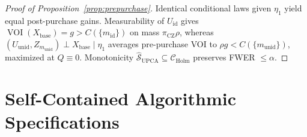 \documentclass[11pt]{article}
\theoremstyle{remark}
\begin{document}
\begin{proof}[Proof of Proposition~\ref{prop:prepurchase}]
Identical conditional laws given $\eta_1$ yield equal post-purchase gains. Measurability of $U_{\text{id}}$ gives $\operatorname{VOI}(X_{\text{base}}) = g > C(\{m_{\text{id}}\})$ on mass $\pi_{\text{CZ}}\rho$, whereas $(U_{\text{unid}}, Z_{m_{\text{unid}}}) \perp X_{\text{base}} \mid \eta_1$ averages pre-purchase VOI to $\rho g < C(\{m_{\text{unid}}\})$, maximized at $Q \equiv 0$. Monotonicity $\hat{\mathcal{S}}_{\text{UPCA}} \subseteq \mathcal{C}_{\text{Holm}}$ preserves FWER $\le \alpha$.
\end{proof}

\section{Self-Contained Algorithmic Specifications}
\label{app:self_contained}
\end{document}
